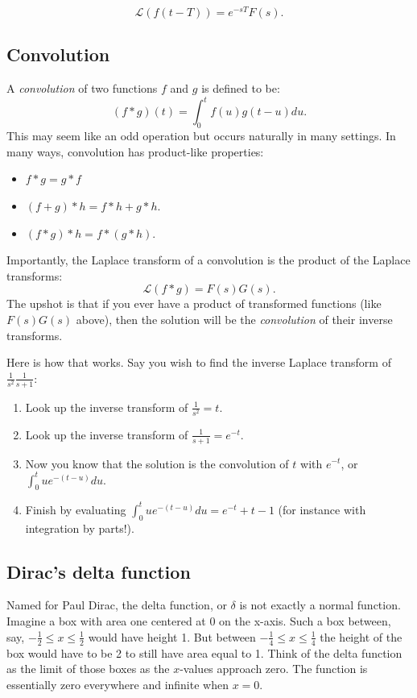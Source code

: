 \documentclass[10pt]{article}
\begin{document}
\[
\mathcal{L}(f(t -T)) = e^{-sT}F(s).
\]

\subsection*{Convolution}

A \emph{convolution} of two functions $f$ and $g$ is defined to be:
\[
(f * g)(t) = \int_0^t f(u)g(t-u)du.
\]
This may seem like an odd operation but occurs naturally in many settings. In many
ways, convolution has product-like properties:
\begin{itemize}
\item[] $f*g = g*f$
\item[] $(f + g)*h = f*h + g*h$.
\item[] $(f * g) * h = f * (g * h)$.
\end{itemize}
Importantly, 
the Laplace transform of a convolution is the product of the Laplace transforms:
\[
\mathcal{L}(f*g) = F(s)G(s).
\]
The upshot is that if you ever have a product of transformed functions (like $F(s)G(s)$ above),
then the solution will be the \emph{convolution} of their inverse transforms.

Here is how that works. Say you wish to find the inverse Laplace transform of
$\frac{1}{s^2}\frac{1}{s+1}$:
\begin{enumerate}
\item Look up the inverse transform of $\frac{1}{s^2} = t$.
\item Look up the inverse transform of $\frac{1}{s+1} = e^{-t}$.
\item Now you know that the solution is the convolution of $t$ with $e^{-t}$, or $\int_0^t ue^{-(t-u)}du$.
\item Finish by evaluating $\int_0^t ue^{-(t-u)}du = e^{-t} + t - 1$ (for instance with integration by parts!).
\end{enumerate}

\subsection*{Dirac's delta function}

Named for Paul Dirac, the delta function, or $\delta$ is not exactly a normal function. Imagine a box with area
one centered at 0 on the x-axis. Such a box between, say, $-\frac{1}{2} \le x \le \frac{1}{2}$ would have
height 1. But between $-\frac{1}{4} \le x \le \frac{1}{4}$ the height of the box would have to be 2 to
still have area equal to 1. Think of the delta function as the limit of those boxes as the $x$-values approach
zero. The function is essentially zero everywhere and infinite when $x=0$.
\end{document}
